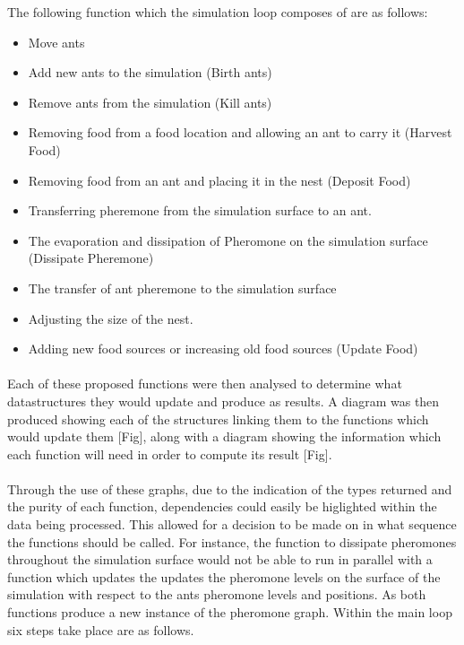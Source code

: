 \documentclass[main.tex]{subfiles}
\begin{document}
The following function which the simulation loop composes of are as follows:
\begin{itemize}
        \item Move ants
        \item Add new ants to the simulation (Birth ants)
        \item Remove ants from the simulation (Kill ants)
        \item Removing food from a food location and allowing an ant to carry it (Harvest Food)
        \item Removing food from an ant and placing it in the nest (Deposit Food)
        \item Transferring pheremone from the simulation surface to an ant.
        \item The evaporation and dissipation of Pheromone on the simulation surface (Dissipate Pheremone)
        \item The transfer of ant pheremone to the simulation surface
        \item Adjusting the size of the nest.
        \item Adding new food sources or increasing old food sources (Update Food)
\end{itemize}

\paragraph{}Each of these proposed functions were then analysed to determine what datastructures they would update and produce as results. A diagram was then produced showing each of the structures linking them to the functions which would update them [Fig], along with a diagram showing the information which each function will need in order to compute its result [Fig].


\paragraph{}Through the use of these graphs, due to the indication of the types returned and the purity of each function, dependencies could easily be higlighted within the data being processed. This allowed for a decision to be made on in what sequence the functions should be called. For instance, the function to dissipate pheromones throughout the simulation surface would not be able to run in parallel with a function which updates the updates the pheromone levels on the surface of the simulation with respect to the ants pheromone levels and positions. As both functions produce a new instance of the pheromone graph. Within the main loop six steps take place are as follows.
\end{document}
